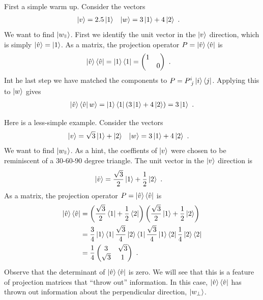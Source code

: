 \documentclass[12pt]{article}
\begin{document}
\begin{example}
First a simple warm up. Consider the vectors
\begin{align}
    \left|v\right\rangle &= 2.5 \left|1\right\rangle
    &
    \left|w\right\rangle &= 3\left|1\right\rangle + 4\left|2\right\rangle \ .
\end{align}
We want to find $\ket{w_\paral}$. First we identify the unit vector in the $\left|v\right\rangle$ direction, which is simply $\left|\hat{v}\right\rangle = \left|1\right\rangle$. As a matrix, the projection operator $P = \left|\hat{v}\right\rangle \left\langle\hat{v}\right|$ is
\begin{align}
    \left|\hat{v}\right\rangle \left\langle\hat{v}\right| = \left|1\right\rangle\left\langle1\right| 
    &=
    \begin{pmatrix}
        1 & \\
        & 0
    \end{pmatrix}
    \ .
\end{align}
Int he last step we have matched the components to  $P = P\aij{i}{j}\ket{i}\bra{j}$.
Applying this to $\left|w\right\rangle$ gives
\begin{align}
    \left|\hat{v}\right\rangle \left\langle\hat{v}\right|w\rangle = \left|1\right\rangle\left\langle1\right|\left(3\left|1\right\rangle+ 4\left|2\right\rangle\right)
    = 3 \left|1\right\rangle \ .
\end{align}
\end{example}

\begin{example}
Here is a less-simple example. Consider the vectors
\begin{align}
    \left|v\right\rangle &= \sqrt{3} \left|1\right\rangle + \left|2\right\rangle
    &
    \left|w\right\rangle &= 3\left|1\right\rangle + 4\left|2\right\rangle \ .
\end{align}
We want to find $\ket{w_\paral}$. As a hint, the coeffients of $\left|v\right\rangle$ were chosen to be reminiscent of a 30-60-90 degree triangle. The unit vector in the $\left|v\right\rangle$ direction is
\begin{align}
    \left|\hat{v}\right\rangle 
    &= 
    \frac{\sqrt{3}}{2} \left|1\right\rangle + \frac{1}{2} \left|2\right\rangle \ .
\end{align}
As a matrix, the projection operator $P = \left|\hat{v}\right\rangle \left\langle\hat{v}\right|$ is
\begin{align}
    \left|\hat{v}\right\rangle \left\langle\hat{v}\right|
    &=
    \left(\frac{\sqrt{3}}{2}\left\langle1\right| + \frac{1}{2} \left\langle2\right|\right)
    \left(\frac{\sqrt{3}}{2}\left|1\right\rangle + \frac{1}{2} \left|2\right\rangle\right)
    \\
    &=
    \frac{3}{4}\left|1\right\rangle\left\langle1\right|
    \frac{\sqrt{3}}{4}\left|2\right\rangle\left\langle1\right|
    \frac{\sqrt{3}}{4}\left|1\right\rangle\left\langle2\right|
    \frac{1}{4}\left|2\right\rangle\left\langle2\right|
    \\
    &=
    \frac{1}{4}
    \begin{pmatrix}
        3 & \sqrt{3} \\
        \sqrt{3} & 1
    \end{pmatrix}
    \ .
\end{align}
Observe that the determinant of $\left|\hat{v}\right\rangle \left\langle\hat{v}\right|$ is zero. We will see that this is a feature of projection matrices that ``throw out'' information. In this case, $\left|\hat{v}\right\rangle \left\langle\hat{v}\right|$ has thrown out information about the perpendicular direction, $\left|w_\perp\right\rangle$.
\end{example}
\end{document}
